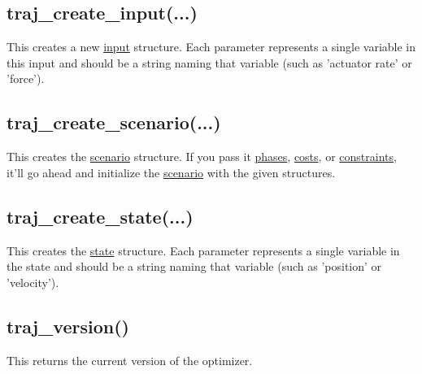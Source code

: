 \documentclass{article}
\begin{document}
		\subsection{traj\_create\_input(...)}
			\label{subsec:traj_create_input}
			This creates a new \hyperref[sec:input]{input} structure. Each parameter represents a single variable in this input
			and should be a string naming that variable (such as 'actuator rate' or 'force').

		\subsection{traj\_create\_scenario(...)}
			This creates the \hyperref[sec:scenario]{scenario} structure. If you pass it \hyperref[sec:phase]{phases},
			\hyperref[sec:cost]{costs}, or \hyperref[sec:constraint]{constraints}, it'll go ahead and
			initialize the \hyperref[sec:scenario]{scenario} with the given structures.

		\subsection{traj\_create\_state(...)}
			\label{subsec:traj_create_state}
			This creates the \hyperref[sec:state]{state} structure. Each parameter represents a single variable in the state
			and should be a string naming that variable (such as 'position' or 'velocity').

		\subsection{traj\_version()}
			This returns the current version of the optimizer.
\end{document}
